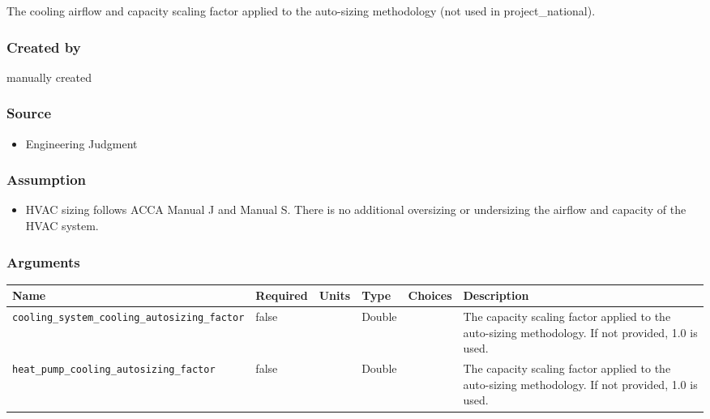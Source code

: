 The cooling airflow and capacity scaling factor applied to the
auto-sizing methodology (not used in project\_national).

\subsubsection{Created by}\label{created-by-63}

manually created

\subsubsection{Source}\label{source-62}

\begin{itemize}
 
\item
  Engineering Judgment
\end{itemize}

\subsubsection{Assumption}\label{assumption-35}

\begin{itemize}
 
\item
  HVAC sizing follows ACCA Manual J and Manual S. There is no additional
  oversizing or undersizing the airflow and capacity of the HVAC system.
\end{itemize}

\subsubsection{Arguments}\label{arguments-40}

\begin{longtable}[]{@{}llllll@{}}
\toprule\noalign{}
Name & Required & Units & Type & Choices & Description \\
\midrule\noalign{}
\endhead
\bottomrule\noalign{}
\endlastfoot
\texttt{cooling\_system\_cooling\_autosizing\_factor} & false & & Double
& & The capacity scaling factor applied to the auto-sizing methodology.
If not provided, 1.0 is used. \\
\texttt{heat\_pump\_cooling\_autosizing\_factor} & false & & Double & &
The capacity scaling factor applied to the auto-sizing methodology. If
not provided, 1.0 is used. \\
\end{longtable}

